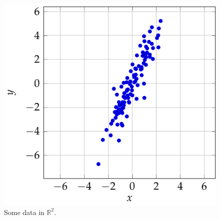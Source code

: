 \documentclass[a4paper, 12pt]{article}
\numberwithin{equation}{section}
\numberwithin{figure}{section}
\theoremstyle{definition}
\begin{document}
\begin{figure}[h]
    \centering
    \includegraphics{graphics/pca_example.pdf}
    \caption{Some data in $\mathbb{R}^2$.}
	\label{fig:pca-example}
\end{figure}
\end{document}
